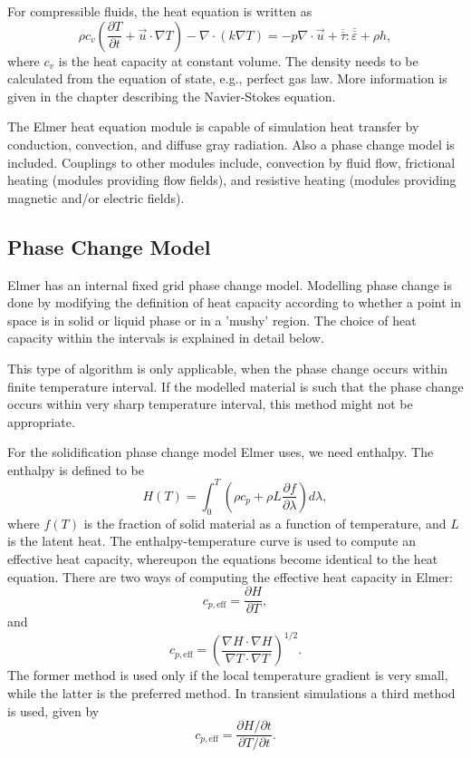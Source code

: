 For compressible fluids, the heat equation is written as
\begin{equation}
\rho c_v\left(\frac{\partial T}{\partial t} + \vec{u}\cdot\nabla T\right) -
\nabla\cdot\left(k\nabla T\right) = - p \nabla\cdot\vec{u} 
+ \overline{\overline\tau}:\overline{\overline \varepsilon}
+ \rho h,
\end{equation}
where $c_v$ is the heat capacity at constant volume. The density needs to be
calculated from the equation of state, e.g., perfect gas law. More
information is given in the chapter describing the Navier-Stokes equation.

The Elmer heat equation module is capable of simulation heat transfer by
conduction, convection, and diffuse gray radiation. Also a phase change
model is included. Couplings to other modules include, convection by
fluid flow, frictional heating (modules providing flow fields), and
resistive heating (modules providing magnetic and/or electric fields).


\subsection{Phase Change Model}

Elmer has an internal fixed grid phase change model. Modelling phase change is done
by modifying the definition of heat capacity according to whether
a point in space is in solid or liquid phase or in a 'mushy' region.
The choice of heat capacity within the intervals is explained in detail
below.

This type of algorithm is only applicable, when the phase change occurs
within finite temperature interval. If the modelled material is such that
the phase change occurs within very sharp temperature interval, this
method might not be appropriate.

For the solidification phase change model Elmer uses,  we need enthalpy.
The enthalpy is defined to be
\begin{equation}
H(T) = \int_0^T \left ( \rho c_p + \rho L\frac{\partial f}{\partial \lambda}\right )d\lambda,
\end{equation}
where $f(T)$ is the fraction of solid material as a function of
temperature, and $L$ is the latent heat.
The enthalpy-temperature curve is used
to compute an effective heat capacity, whereupon the equations become identical
to the heat equation. There are two ways of computing the effective heat capacity in Elmer:
\begin{equation}
c_{p,\mathrm{eff}} = \frac{\partial H}{\partial T},
\end{equation}
and
\begin{equation}
c_{p,\mathrm{eff}} = \left ( \frac{\nabla H\cdot\nabla H}{\nabla T\cdot\nabla T}\right )^{1/2}.
\end{equation}
The former method is used only if the local temperature gradient is very small, while
the latter is the preferred method. In transient simulations a third method is used, given
by
\begin{equation}
c_{p,\mathrm{eff}} = \frac{\partial H/\partial t}{\partial T/\partial t}.
\end{equation}

